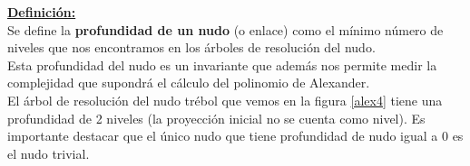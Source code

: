 \underline{\textbf{Definición:}}\\
Se define la \textbf{profundidad de un nudo} (o enlace) como el mínimo número de niveles que nos encontramos en los árboles de resolución del nudo. \\

Esta profundidad del nudo es un invariante que además nos permite medir la complejidad que supondrá el cálculo del polinomio de Alexander. \\

El árbol de resolución del nudo trébol que vemos en la figura \ref{alex4} tiene una profundidad de 2 niveles (la proyección inicial no se cuenta como nivel). Es importante destacar que el único nudo que tiene profundidad de nudo igual a 0 es el nudo trivial. \\